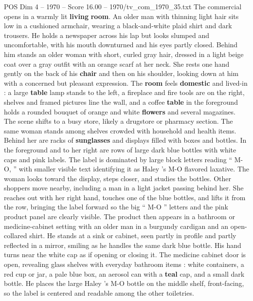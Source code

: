 \begin{textsample}{POS Dim 4 – 1970 – Score 16.00 – 1970/tv\_com\_1970\_35.txt}  \label{ex:f4_pos_083}
The commercial opens in a warmly lit \textbf{living} \textbf{room}.
An older man with thinning light hair sits low in a cushioned armchair, wearing a black-and-white plaid shirt and dark trousers.
He holds a newspaper across his lap but looks slumped and uncomfortable, with his mouth downturned and his eyes partly closed.
Behind him stands an older woman with short, curled gray hair, dressed in a light beige coat over a gray outfit with an orange scarf at her neck.
She rests one hand gently on the back of his \textbf{chair} and then on his shoulder, looking down at him with a concerned but pleasant expression.
The \textbf{room} feels \textbf{domestic} and lived-in : a large \textbf{table} lamp stands to the left, a fireplace and fire tools are on the right, shelves and framed pictures line the wall, and a coffee \textbf{table} in the foreground holds a rounded bouquet of orange and white \textbf{flowers} and several magazines.
The scene shifts to a busy store, likely a drugstore or pharmacy section.
The same woman stands among shelves crowded with household and health items.
Behind her are racks of \textbf{sunglasses} and displays filled with boxes and bottles.
In the foreground and to her right are rows of large dark blue bottles with white caps and pink labels.
The label is dominated by large block letters reading “ M-O, ” with smaller visible text identifying it as Haley ’s M-O flavored laxative.
The woman looks toward the display, steps closer, and studies the bottles.
Other shoppers move nearby, including a man in a light jacket passing behind her.
She reaches out with her right hand, touches one of the blue bottles, and lifts it from the row, bringing the label forward so the big “ M-O ” letters and the pink product panel are clearly visible.
The product then appears in a bathroom or medicine-cabinet setting with an older man in a burgundy cardigan and an open-collared shirt.
He stands at a sink or cabinet, seen partly in profile and partly reflected in a mirror, smiling as he handles the same dark blue bottle.
His hand turns near the white cap as if opening or closing it.
The medicine cabinet door is open, revealing glass shelves with everyday bathroom items : white containers, a red cup or jar, a pale blue box, an aerosol can with a \textbf{teal} cap, and a small dark bottle.
He places the large Haley ’s M-O bottle on the middle shelf, front-facing, so the label is centered and readable among the other toiletries.

\end{textsample}
